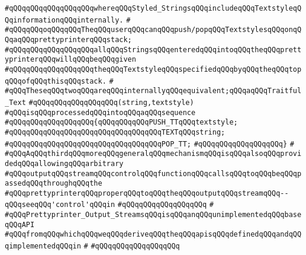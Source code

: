 \verb|#qQQqqQQqqQQqqQQqqQQqwhereqQQqStyled_StringsqQQqincludeqQQqTextstyleqQQqinformationqQQqinternally.|\newline
\verb|#|\newline
\verb|#qQQqqQQqoqQQqqQQqTheqQQquserqQQqcanqQQqpush/popqQQqTextstylesqQQqonqQQqaqQQqprettyprinterqQQqstack;|\newline
\verb|#qQQqqQQqqQQqqQQqqQQqallqQQqStringsqQQqenteredqQQqintoqQQqtheqQQqprettyprinterqQQqwillqQQqbeqQQqgiven|\newline
\verb|#qQQqqQQqqQQqqQQqqQQqtheqQQqTextstyleqQQqspecifiedqQQqbyqQQqtheqQQqtopqQQqofqQQqthisqQQqstack.|\newline
\verb|#|\newline
\verb|#qQQqTheseqQQqtwoqQQqareqQQqinternallyqQQqequivalent;qQQqaqQQqTraitful_Text|\newline
\verb|#qQQqqQQqqQQqqQQqqQQq(string,textstyle)|\newline
\verb|#qQQqisqQQqprocessedqQQqintoqQQqaqQQqsequence|\newline
\verb|#qQQqqQQqqQQqqQQqqQQq{qQQqqQQqqQQqPUSH_TTqQQqtextstyle;|\newline
\verb|#qQQqqQQqqQQqqQQqqQQqqQQqqQQqqQQqqQQqTEXTqQQqstring;|\newline
\verb|#qQQqqQQqqQQqqQQqqQQqqQQqqQQqqQQqqQQqPOP_TT;|\newline
\verb|#qQQqqQQqqQQqqQQqqQQq}|\newline
\verb|#|\newline
\verb|#qQQqAqQQqthirdqQQqmoreqQQqgeneralqQQqmechanismqQQqisqQQqalsoqQQqprovidedqQQqallowingqQQqarbitrary|\newline
\verb|#qQQqoutputqQQqstreamqQQqcontrolqQQqfunctionqQQqcallsqQQqtoqQQqbeqQQqpassedqQQqthroughqQQqthe|\newline
\verb|#qQQqprettyprinterqQQqproperqQQqtoqQQqtheqQQqoutputqQQqstreamqQQq--qQQqseeqQQq'control'qQQqin|\newline
\verb|#qQQqqQQqqQQqqQQqqQQq|\newline
\verb|#|\newline
\verb|#qQQqPrettyprinter_Output_StreamsqQQqisqQQqanqQQqunimplementedqQQqbaseqQQqAPI|\newline
\verb|#qQQqfromqQQqwhichqQQqweqQQqderiveqQQqtheqQQqapisqQQqdefinedqQQqandqQQqimplementedqQQqin|\newline
\verb|#|\newline
\verb|#qQQqqQQqqQQqqQQqqQQq|\newline
